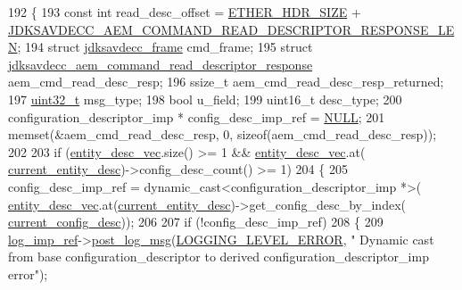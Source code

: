 \begin{DoxyCode}
192 \{
193     \textcolor{keyword}{const} \textcolor{keywordtype}{int} read\_desc\_offset = \hyperlink{namespaceavdecc__lib_a6c827b1a0d973e18119c5e3da518e65ca9512ad9b34302ba7048d88197e0a2dc0}{ETHER\_HDR\_SIZE} + 
      \hyperlink{group__command__read__descriptor__response_ga66447b2275458270651649e1df225406}{JDKSAVDECC\_AEM\_COMMAND\_READ\_DESCRIPTOR\_RESPONSE\_LEN};
194     \textcolor{keyword}{struct }\hyperlink{structjdksavdecc__frame}{jdksavdecc\_frame} cmd\_frame;
195     \textcolor{keyword}{struct }\hyperlink{structjdksavdecc__aem__command__read__descriptor__response}{jdksavdecc\_aem\_command\_read\_descriptor\_response} 
      aem\_cmd\_read\_desc\_resp;
196     ssize\_t aem\_cmd\_read\_desc\_resp\_returned;
197     \hyperlink{parse_8c_a6eb1e68cc391dd753bc8ce896dbb8315}{uint32\_t} msg\_type;
198     \textcolor{keywordtype}{bool} u\_field;
199     uint16\_t desc\_type;
200     configuration\_descriptor\_imp * config\_desc\_imp\_ref = \hyperlink{openavb__types__base__pub_8h_a070d2ce7b6bb7e5c05602aa8c308d0c4}{NULL};
201     memset(&aem\_cmd\_read\_desc\_resp, 0, \textcolor{keyword}{sizeof}(aem\_cmd\_read\_desc\_resp));
202 
203     \textcolor{keywordflow}{if} (\hyperlink{classavdecc__lib_1_1end__station__imp_a72edab41bc56e3c1757944a7df188a3d}{entity\_desc\_vec}.size() >= 1 && \hyperlink{classavdecc__lib_1_1end__station__imp_a72edab41bc56e3c1757944a7df188a3d}{entity\_desc\_vec}.at(
      \hyperlink{classavdecc__lib_1_1end__station__imp_afd78c89df26ba7641e1adb764c0e827d}{current\_entity\_desc})->config\_desc\_count() >= 1)
204     \{
205         config\_desc\_imp\_ref = \textcolor{keyword}{dynamic\_cast<}configuration\_descriptor\_imp *\textcolor{keyword}{>}(
      \hyperlink{classavdecc__lib_1_1end__station__imp_a72edab41bc56e3c1757944a7df188a3d}{entity\_desc\_vec}.at(\hyperlink{classavdecc__lib_1_1end__station__imp_afd78c89df26ba7641e1adb764c0e827d}{current\_entity\_desc})->get\_config\_desc\_by\_index(
      \hyperlink{classavdecc__lib_1_1end__station__imp_a60b1af40d35e8a86b0082c54ab6cb6a8}{current\_config\_desc}));
206 
207         \textcolor{keywordflow}{if} (!config\_desc\_imp\_ref)
208         \{
209             \hyperlink{namespaceavdecc__lib_acbe3e2a96ae6524943ca532c87a28529}{log\_imp\_ref}->\hyperlink{classavdecc__lib_1_1log_a68139a6297697e4ccebf36ccfd02e44a}{post\_log\_msg}(\hyperlink{namespaceavdecc__lib_a501055c431e6872ef46f252ad13f85cdaf2c4481208273451a6f5c7bb9770ec8a}{LOGGING\_LEVEL\_ERROR}, \textcolor{stringliteral}{"
      Dynamic cast from base configuration\_descriptor to derived configuration\_descriptor\_imp error"});

\end{DoxyCode}
